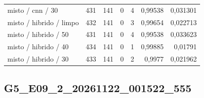 \begin{longtable}{@{}p{.38\linewidth}rrrrrr@{}}
misto /\allowbreak{} cnn /\allowbreak{} 30 & 431 & 141 & 0 & 4 & 0,99538 & 0,031301\\
misto /\allowbreak{} hibrido /\allowbreak{} limpo & 432 & 141 & 0 & 3 & 0,99654 & 0,022713\\
misto /\allowbreak{} hibrido /\allowbreak{} 50 & 431 & 141 & 0 & 4 & 0,99538 & 0,033623\\
misto /\allowbreak{} hibrido /\allowbreak{} 40 & 434 & 141 & 0 & 1 & 0,99885 & 0,01791\\
misto /\allowbreak{} hibrido /\allowbreak{} 30 & 433 & 141 & 0 & 2 & 0,9977 & 0,021962\\
\bottomrule\end{longtable}\normalsize

\subsection{G5\_E09\_2\_20261122\_001522\_555}
